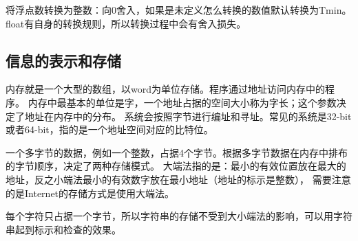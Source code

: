 将浮点数转换为整数：向0舍入，如果是未定义怎么转换的数值默认转换为Tmin。float有自身的转换规则，所以转换过程中会有舍入损失。
\subsection{信息的表示和存储}

内存就是一个大型的数组，以word为单位存储。程序通过地址访问内存中的程序。
内存中最基本的单位是字，一个地址占据的空间大小称为字长；这个参数决定了地址在内存中的分布。
系统会按照字节进行编址和寻址。常见的系统是32-bit或者64-bit，指的是一个地址空间对应的比特位。

一个多字节的数据，例如一个整数，占据4个字节。根据多字节数据在内存中排布的字节顺序，决定了两种存储模式。
大端法指的是：最小的有效位置放在最大的地址，反之小端法最小的有效数字放在最小地址（地址的标示是整数）， 
需要注意的是Internet的存储方式是使用大端法。

每个字符只占据一个字节，所以字符串的存储不受到大小端法的影响，可以用字符串起到标示和检查的效果。

